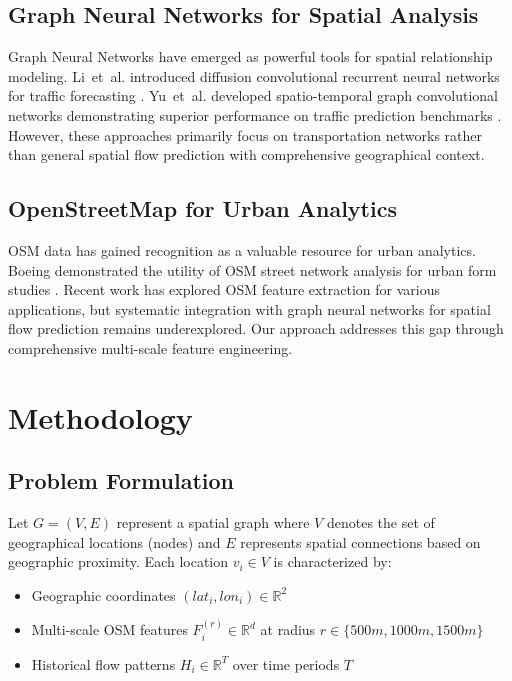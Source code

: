 \documentclass[twocolumn,11pt]{IEEEtran}  %
\begin{document}
\subsection{Graph Neural Networks for Spatial Analysis}
Graph Neural Networks have emerged as powerful tools for spatial relationship modeling. Li~et~al. introduced diffusion convolutional recurrent neural networks for traffic forecasting \cite{li2018}. Yu~et~al. developed spatio-temporal graph convolutional networks demonstrating superior performance on traffic prediction benchmarks \cite{yu2018}. However, these approaches primarily focus on transportation networks rather than general spatial flow prediction with comprehensive geographical context.

\subsection{OpenStreetMap for Urban Analytics}
OSM data has gained recognition as a valuable resource for urban analytics. Boeing demonstrated the utility of OSM street network analysis for urban form studies \cite{boeing2017}. Recent work has explored OSM feature extraction for various applications, but systematic integration with graph neural networks for spatial flow prediction remains underexplored. Our approach addresses this gap through comprehensive multi-scale feature engineering.

\section{Methodology}

\subsection{Problem Formulation}

Let $G = (V, E)$ represent a spatial graph where $V$ denotes the set of geographical locations (nodes) and $E$ represents spatial connections based on geographic proximity. Each location $v_i \in V$ is characterized by:
\begin{itemize}
\item Geographic coordinates $(lat_i, lon_i) \in \mathbb{R}^2$
\item Multi-scale OSM features $F_i^{(r)} \in \mathbb{R}^d$ at radius $r \in \{500m, 1000m, 1500m\}$
\item Historical flow patterns $H_i \in \mathbb{R}^T$ over time periods $T$
\end{itemize}
\end{document}
